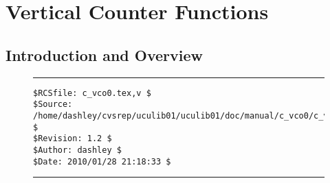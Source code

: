 
\chapter{Vertical Counter Functions}

\label{cvco0}

\section{Introduction and Overview}
\label{cvco0:siov0}


\noindent\begin{figure}[!b]
\noindent\rule[-0.25in]{\textwidth}{1pt}
\begin{tiny}
\begin{verbatim}
$RCSfile: c_vco0.tex,v $
$Source: /home/dashley/cvsrep/uculib01/uculib01/doc/manual/c_vco0/c_vco0.tex,v $
$Revision: 1.2 $
$Author: dashley $
$Date: 2010/01/28 21:18:33 $
\end{verbatim}
\end{tiny}
\noindent\rule[0.25in]{\textwidth}{1pt}
\end{figure}

%
%

